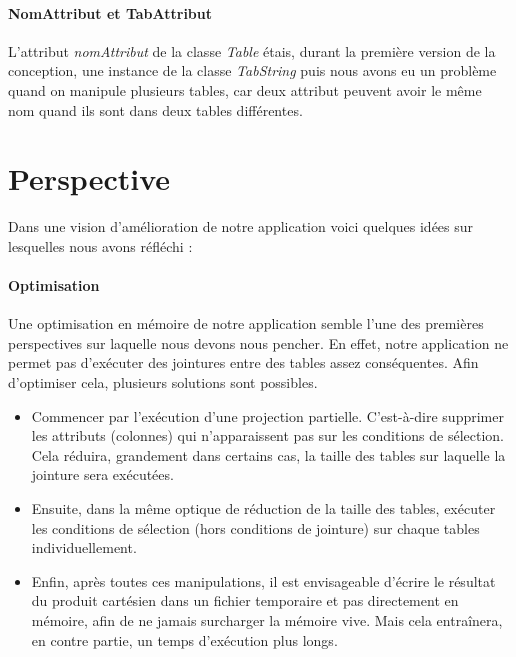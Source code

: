 \documentclass[oneside,13pt,a4paper]{report}
\begin{document}
\subsubsection{NomAttribut et TabAttribut}

L'attribut \textit{nomAttribut} de la classe \textit{Table} étais, durant la première version de la conception, une instance de la classe \textit{TabString} puis nous avons eu un problème quand on manipule plusieurs tables, car deux attribut peuvent avoir le même nom quand ils sont dans deux tables différentes.


\chapter{Perspective}

Dans une vision d'amélioration de notre application voici quelques idées sur lesquelles nous avons réfléchi :

\subsubsection{Optimisation}

Une optimisation en mémoire de notre application semble l'une des premières perspectives sur laquelle nous devons nous pencher. En effet, notre application ne permet pas d'exécuter des jointures entre des tables assez conséquentes. Afin d'optimiser cela, plusieurs solutions sont possibles.

\begin{itemize}
	\item Commencer par l'exécution d'une projection partielle. C'est-à-dire supprimer les attributs (colonnes) qui n'apparaissent pas sur les conditions de sélection. Cela réduira, grandement dans certains cas, la taille des tables sur laquelle la jointure sera exécutées.
	\item Ensuite, dans la même optique de réduction de la taille des tables, exécuter les conditions de sélection (hors conditions de jointure) sur chaque tables individuellement.
	\item Enfin, après toutes ces manipulations, il est envisageable d'écrire le résultat du produit cartésien dans un fichier temporaire et pas directement en mémoire, afin de ne jamais surcharger la mémoire vive. Mais cela entraînera, en contre partie, un temps d'exécution plus longs.
\end{itemize}
\end{document}
